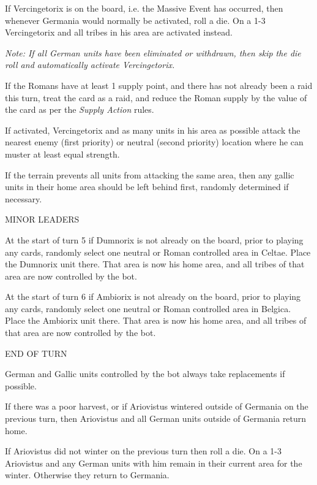 If Vercingetorix is on the board, i.e. the Massive Event has occurred, then whenever Germania would normally be activated, roll a die. On a 1-3 Vercingetorix and all tribes in his area are activated instead.
    
\textit{Note: If all German units have been eliminated or withdrawn, then skip the die roll and automatically activate Vercingetorix.}
    
If the Romans have at least 1 supply point, and there has not already been a raid this turn, treat the card as a raid, and reduce the Roman supply by the value of the card as per the \textit{Supply Action} rules.
    
If activated, Vercingetorix and as many units in his area as possible attack the nearest enemy (first priority) or neutral (second priority) location where he can muster at least equal strength.
    
If the terrain prevents all units from attacking the same area, then any gallic units in their home area should be left behind first, randomly determined if necessary.

\label{solitaire:minor_leaders}MINOR LEADERS

At the start of turn 5 if Dumnorix is not already on the board, prior to playing any cards, randomly select one neutral or Roman controlled area in Celtae. Place the Dumnorix unit there. That area is now his home area, and all tribes of that area are now controlled by the bot.

At the start of turn 6 if Ambiorix is not already on the board, prior to playing any cards, randomly select one neutral or Roman controlled area in Belgica. Place the Ambiorix unit there. That area is now his home area, and all tribes of that area are now controlled by the bot.

\label{solitaire:end_of_turn}END OF TURN

German and Gallic units controlled by the bot always take replacements if possible.

If there was a poor harvest, or if Ariovistus wintered outside of Germania on the previous turn, then Ariovistus and all German units outside of Germania return home.
    
If Ariovistus did not winter on the previous turn then roll a die. On a 1-3 Ariovistus and any German units with him remain in their current area for the winter. Otherwise they return to Germania.

